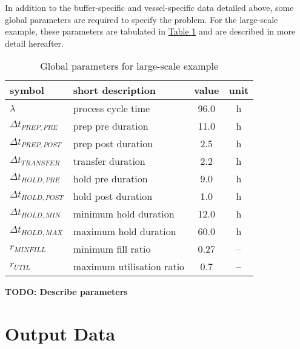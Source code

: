 In addition to the buffer-specific and vessel-specific data detailed above,
some global parameters are required to specify the problem.
For the large-scale example, these parameters are tabulated in
\hyperref[tbl.parameters]{Table \ref*{tbl.parameters}} and are described in
more detail hereafter.
\begin{table}[h!]
    \centering
    \caption{Global parameters for large-scale example}
    \label{tbl.parameters}
    \begin{tabular}{l | l | c | c}
        symbol & short description & value & unit\\ \hline
        $\lambda$ & process cycle time & 96.0 & h\\
        $\Delta t_{PREP,PRE}$ & prep pre duration & 11.0 & h\\
        $\Delta t_{PREP,POST}$ & prep post duration & 2.5 & h\\
        $\Delta t_{TRANSFER}$ & transfer duration & 2.2 & h\\
        $\Delta t_{HOLD,PRE}$ & hold pre duration & 9.0 & h\\
        $\Delta t_{HOLD,POST}$ & hold post duration & 1.0 & h\\
        $\Delta t_{HOLD,MIN}$ & minimum hold duration & 12.0 & h\\
        $\Delta t_{HOLD,MAX}$ & maximum hold duration & 60.0 & h\\
        $r_{MINFILL}$ & minimum fill ratio & 0.27 & --\\
        $r_{UTIL}$ & maximum utilisation ratio & 0.7 & --\\
    \end{tabular}
\end{table}

\textbf{TODO: Describe parameters}

\section{Output Data}\label{S.outputdata}
